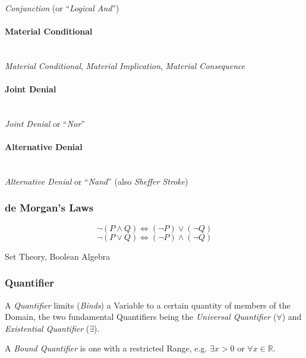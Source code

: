 \emph{Conjunction} (or ``\emph{Logical And}'')



\paragraph{Material Conditional}\label{sec:material_conditional}\hfill \\

\emph{Material Conditional}, \emph{Material Implication},
\emph{Material Consequence}



\paragraph{Joint Denial}\label{sec:joint_denial}\hfill \\

\emph{Joint Denial} or ``\emph{Nor}''



\paragraph{Alternative Denial}\label{sec:alternative_denial}\hfill \\

\emph{Alternative Denial} or ``\emph{Nand}'' (also \emph{Sheffer
  Stroke})



\subsubsection{de Morgan's Laws}\label{sec:de_morgan}

\[
  \neg (P \wedge Q) \Leftrightarrow (\neg P) \vee (\neg Q)
\] \[
  \neg (P \vee Q) \Leftrightarrow (\neg P) \wedge (\neg Q)
\]

Set Theory, Boolean Algebra



\subsubsection{Quantifier}\label{sec:quantifier}

A \emph{Quantifier} limits (\emph{Binds}) a Variable to a certain
quantity of members of the Domain, the two fundamental Quantifiers
being the \emph{Universal Quantifier} ($\forall$) and
\emph{Existential Quantifier} ($\exists$).

A \emph{Bound Quantifier} is one with a restricted Range, e.g.
$\exists x > 0$ or $\forall x \in \mathbb{R}$.

